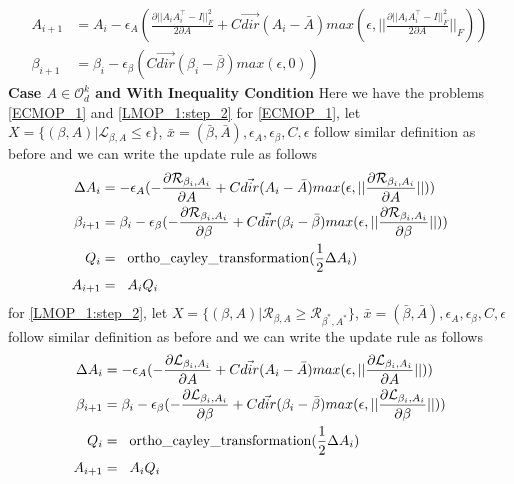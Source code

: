 \begin{equation}
\begin{aligned}
A_{i+1} &= A_{i} - \epsilon_A ( \frac{\partial || A_iA^\top_i -I||^2_F}{2\partial A} + C \vec{dir}(A_i-\bar{A}) max(\epsilon,||\frac{\partial || A_iA^\top_i -I||^2_F}{2\partial A}||_F))\\
\beta_{i+1} &= \beta_{i} - \epsilon_{\beta} ( C \vec{dir}(\beta_i-\bar{\beta}) max(\epsilon,0))
\end{aligned}    
\end{equation}
\newline \textbf{Case $A \in \mathcal{O}_d^k$ and With Inequality Condition}
\newline Here we have the problems \ref{ECMOP_1} and \ref{LMOP_1:step_2} 
\newline for \ref{ECMOP_1}, let $X = \{(\beta, A) |  \mathcal{L}_{\beta, A} \le \epsilon \}$, $\bar{x} = (\bar{\beta},\bar{A}), \epsilon_A, \epsilon_{\beta}, C, \epsilon$ follow similar definition as before and we can write the update rule as follows
\begin{equation}
\begin{aligned}
\Delta A_{i} &= - \epsilon_A ( -\frac{\partial \mathcal{R}_{\beta_i, A_i}}{\partial A} + C \vec{dir}(A_i-\bar{A}) max(\epsilon,||\frac{\partial \mathcal{R}_{\beta_i, A_i}}{\partial A}||))\\
\beta_{i+1} &= \beta_{i} - \epsilon_{\beta} ( -\frac{\partial \mathcal{R}_{\beta_i, A_i}}{\partial \beta} + C \vec{dir}(\beta_i-\bar{\beta}) max(\epsilon,||\frac{\partial \mathcal{R}_{\beta_i, A_i}}{\partial \beta}||))\\
Q_i &= \hspace{2mm} \text{ortho\_cayley\_transformation}(\frac{1}{2} \Delta A_i)\\
A_{i+1} &= \hspace{2mm} A_i Q_i \\
\end{aligned}    
\end{equation}
\newline for \ref{LMOP_1:step_2}, let $X = \{(\beta, A) | \mathcal{R}_{\beta, A} \ge \mathcal{R}_{\beta^{*}, A^{*}}\}$, $\bar{x} = (\bar{\beta},\bar{A}), \epsilon_A, \epsilon_{\beta}, C, \epsilon$ follow similar definition as before and we can write the update rule as follows
\begin{equation}
\begin{aligned}
\Delta A_{i} &= - \epsilon_A ( -\frac{\partial \mathcal{L}_{\beta_i, A_i}}{\partial A} + C \vec{dir}(A_i-\bar{A}) max(\epsilon,||\frac{\partial \mathcal{L}_{\beta_i, A_i}}{\partial A}||))\\
\beta_{i+1} &= \beta_{i} - \epsilon_{\beta} ( -\frac{\partial \mathcal{L}_{\beta_i, A_i}}{\partial \beta} + C \vec{dir}(\beta_i-\bar{\beta}) max(\epsilon,||\frac{\partial \mathcal{L}_{\beta_i, A_i}}{\partial \beta}||))\\
Q_i &= \hspace{2mm} \text{ortho\_cayley\_transformation}(\frac{1}{2} \Delta A_i)\\
A_{i+1} &= \hspace{2mm} A_i Q_i \\
\end{aligned}    
\end{equation}
